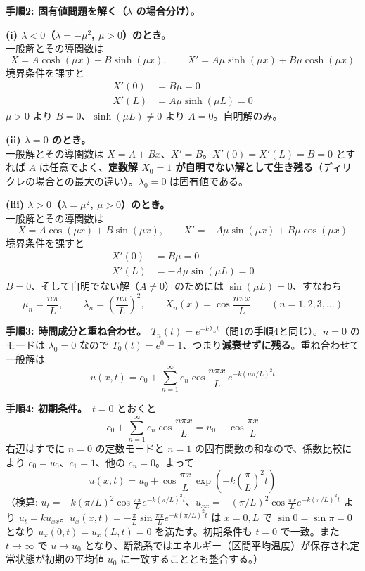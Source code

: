 \documentclass[a4paper,11pt]{article}
\begin{document}
\textbf{手順2: 固有値問題を解く（$\lambda$ の場合分け）。}

\textbf{(i) $\lambda < 0$（$\lambda = -\mu^{2}$, $\mu>0$）のとき。}\\
一般解とその導関数は
\[
X = A\cosh(\mu x) + B\sinh(\mu x), \qquad
X' = A\mu\sinh(\mu x) + B\mu\cosh(\mu x)
\]
境界条件を課すと
\begin{align*}
X'(0) &= B\mu = 0 \\
X'(L) &= A\mu\sinh(\mu L) = 0
\end{align*}
$\mu > 0$ より $B = 0$、$\sinh(\mu L) \neq 0$ より $A = 0$。自明解のみ。

\textbf{(ii) $\lambda = 0$ のとき。}\\
一般解とその導関数は $X = A + Bx$、$X' = B$。$X'(0) = X'(L) = B = 0$ とすれば $A$ は任意でよく、\textbf{定数解 $X_0 = 1$ が自明でない解として生き残る}（ディリクレの場合との最大の違い）。$\lambda_0 = 0$ は固有値である。

\textbf{(iii) $\lambda > 0$（$\lambda = \mu^{2}$, $\mu>0$）のとき。}\\
一般解とその導関数は
\[
X = A\cos(\mu x) + B\sin(\mu x), \qquad
X' = -A\mu\sin(\mu x) + B\mu\cos(\mu x)
\]
境界条件を課すと
\begin{align*}
X'(0) &= B\mu = 0 \\
X'(L) &= -A\mu\sin(\mu L) = 0
\end{align*}
$B = 0$、そして自明でない解（$A \neq 0$）のためには $\sin(\mu L) = 0$、すなわち
\[
\mu_n = \frac{n\pi}{L}, \qquad \lambda_n = \left(\frac{n\pi}{L}\right)^{2}, \qquad X_n(x) = \cos\frac{n\pi x}{L} \qquad (n = 1, 2, 3, \dots)
\]

\textbf{手順3: 時間成分と重ね合わせ。}\ $T_n(t) = e^{-k\lambda_n t}$（問1の手順4と同じ）。$n=0$ のモードは $\lambda_0 = 0$ なので $T_0(t) = e^{0} = 1$、つまり\textbf{減衰せずに残る}。重ね合わせて一般解は
\[
u(x,t) = c_0 + \sum_{n=1}^{\infty} c_n \cos\frac{n\pi x}{L}\,e^{-k(n\pi/L)^2 t}
\]

\textbf{手順4: 初期条件。}\ $t=0$ とおくと
\[
c_0 + \sum_{n=1}^{\infty} c_n \cos\frac{n\pi x}{L} = u_0 + \cos\frac{\pi x}{L}
\]
右辺はすでに $n=0$ の定数モードと $n=1$ の固有関数の和なので、係数比較により $c_0 = u_0$、$c_1 = 1$、他の $c_n = 0$。よって
\[
\boxed{\; u(x,t) = u_0 + \cos\frac{\pi x}{L}\,\exp\!\left(-k\left(\frac{\pi}{L}\right)^{2} t\right) \;}
\]
（検算: $u_t = -k(\pi/L)^2\cos\frac{\pi x}{L}e^{-k(\pi/L)^2t}$、$u_{xx} = -(\pi/L)^2\cos\frac{\pi x}{L}e^{-k(\pi/L)^2t}$ より $u_t = k u_{xx}$。$u_x(x,t) = -\frac{\pi}{L}\sin\frac{\pi x}{L}e^{-k(\pi/L)^2t}$ は $x=0,L$ で $\sin 0 = \sin\pi = 0$ となり $u_x(0,t)=u_x(L,t)=0$ を満たす。初期条件も $t=0$ で一致。また $t\to\infty$ で $u \to u_0$ となり、断熱系ではエネルギー（区間平均温度）が保存され定常状態が初期の平均値 $u_0$ に一致することとも整合する。）
\end{document}
